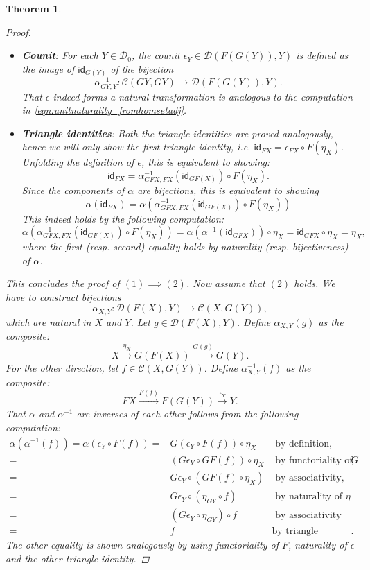 \documentclass[a4paper,11pt, oneside,titlepage=false]{scrbook}
\theoremstyle{plain}
\newtheorem{thm}{Theorem}
\theoremstyle{definition}
\newcommand{\cfont}[1]{\ensuremath{\mathsf{#1}}}
\newcommand{\Cat}[1]{\mathcal{#1}}
\newcommand{\CC}{\Cat{C}}
\newcommand{\DD}{\Cat{D}}
\newcommand{\Ob}[1]{{#1}_0}
\newcommand{\CHom}[3]{{#1}(#2,#3)}
\newcommand{\Id}[1][]{\cfont{id}_{#1}}
\newcommand{\co}[2]{\ensuremath{#2 \circ #1}}
\begin{document}
\begin{thm}
\begin{proof}
\begin{itemize}
\[\begin{tikzcd}
\end{tikzcd}
\]
That this square is indeed commutative follows from the following computation:
\begin{equation}\label{eqn:unitnaturality_fromhomsetadj}
\co{f}{\alpha(\Id[FY])} = \alpha(\co{F(f)}{\Id[FY]}) = \alpha(F(f)) =  \alpha(\co{\Id[FX]}{F(f)}) = \co{\alpha(\Id[FX])}{G(F(f))},
\end{equation}
where the first and last equality hold by naturality of $\alpha$.
\item \textbf{Counit}: For each $Y\in\Ob{\DD}$, the counit $\epsilon_Y \in \CHom{\DD}{F(G(Y))}{Y}$ is defined as the image of $\Id[G(Y)]$ of the bijection
\[
\alpha^{-1}_{GY,Y} : \CHom{\CC}{GY}{GY}\to \CHom{\DD}{F(G(Y))}{Y}.
\]
That $\epsilon$ indeed forms a natural transformation is analogous to the computation in \cref{eqn:unitnaturality_fromhomsetadj}.
\item \textbf{Triangle identities}: Both the triangle identities are proved analogously, hence we will only show the first triangle identity, i.e. $\Id[FX] = \co{F(\eta_X)}{\epsilon_{FX}}$. Unfolding the definition of $\epsilon$, this is equivalent to showing:
\[
\Id[FX] = \co{F(\eta_X)}{\alpha^{-1}_{GFX,FX}(\Id[GF(X)])}.
\]
Since the components of $\alpha$ are bijections, this is equivalent to showing
\[
\alpha(\Id[FX]) = \alpha(\co{F(\eta_X)}{\alpha^{-1}_{GFX,FX}(\Id[GF(X)])})
\]
This indeed holds by the following computation:
\[
\alpha(\co{F(\eta_X)}{\alpha^{-1}_{GFX,FX}(\Id[GF(X)])}) = \co{\eta_X}{\alpha(\alpha^{-1}(\Id[GFX]))} = \co{\eta_X}{\Id[GFX]} = \eta_X,
\]
where the first (resp. second) equality holds by naturality (resp. bijectiveness) of $\alpha$.
\end{itemize}
This concludes the proof of $(1)\implies (2)$. Now assume that $(2)$ holds. We have to construct bijections
\[
\alpha_{X,Y} : \CHom{\DD}{F(X)}{Y} \to \CHom{\CC}{X}{G(Y)},
\]
which are natural in $X$ and $Y$. Let $g\in \CHom{\DD}{F(X)}{Y}$. Define $\alpha_{X,Y}(g)$ as the composite:
\[
X \xrightarrow{\eta_X} G(F(X)) \xrightarrow{G(g)} G(Y).
\]
For the other direction, let $f\in \CHom{\CC}{X}{G(Y)}$. Define $\alpha^{-1}_{X,Y}(f)$ as the composite:
\[
FX \xrightarrow{F(f)} F(G(Y)) \xrightarrow{\epsilon_Y} Y.
\]
That $\alpha$ and $\alpha^{-1}$ are inverses of each other follows from the following computation:
\begin{eqnarray*}
\alpha(\alpha^{-1}(f)) = \alpha(\co{F(f)}{\epsilon_Y}) =& \co{\eta_X}{G(\co{F(f)}{\epsilon_Y})} &\text{ by definition, }\\
	=& \co{\eta_X}{(\co{GF(f)}{G\epsilon_Y})} &\text{ by functoriality of $G$},\\
	=& \co{(\co{\eta_X}{GF(f)})}{G\epsilon_Y} &\text{ by associativity},\\
	=& \co{(\co{f}{\eta_{GY}})}{G\epsilon_Y} &\text{ by naturality of $\eta$}\\
	=& \co{f}{(\co{\eta_{GY}}{G\epsilon_Y})} &\text{ by associativity}\\
	=& f &\text{by triangle identity}.
\end{eqnarray*}
The other equality is shown analogously by using functoriality of $F$, naturality of $\epsilon$ and the other triangle identity.


\end{proof}
\end{thm}
\end{document}
